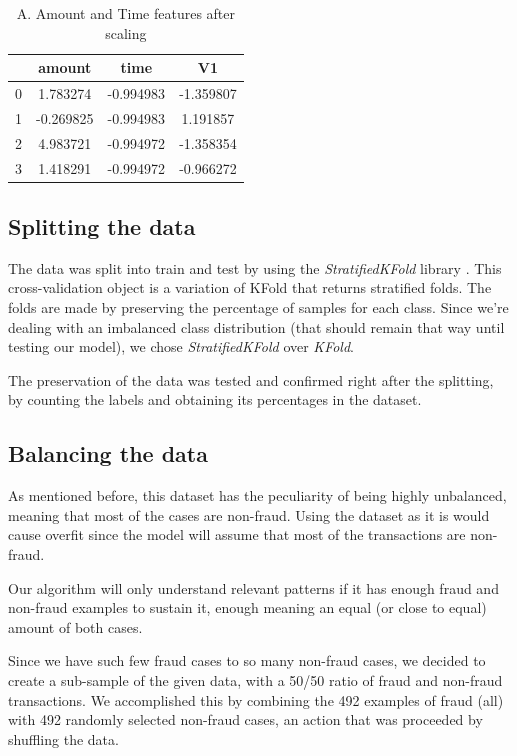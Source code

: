 \documentclass[conference]{IEEEtran}
\begin{document}
\begin{table}[H]
\caption{A. Amount and Time features after scaling}
\begin{center}
\begin{tabular}{|c|c|c|c|}
\hline
\textbf{} & \textbf{amount} & \textbf{time}& \textbf{V1} \\
\hline
0 & 1.783274 & -0.994983 & -1.359807 \\
1 & -0.269825 & -0.994983 & 1.191857 \\
2 & 4.983721 & -0.994972 & -1.358354 \\
3 & 1.418291 & -0.994972 & -0.966272 \\
\hline
\end{tabular}
\end{center}
\end{table}

\subsection{Splitting the data}
The data was split into train and test by using the \textit{StratifiedKFold} library \cite{sklearn_strat_kfold}. This cross-validation object is a variation of KFold that returns stratified folds. The folds are made by preserving the percentage of samples for each class. Since we're dealing with an imbalanced class distribution (that should remain that way until testing our model), we chose \textit{StratifiedKFold} over \textit{KFold}.

The preservation of the data was tested and confirmed right after the splitting, by counting the labels and obtaining its percentages in the dataset.

\subsection{Balancing the data}
As mentioned before, this dataset has the peculiarity of being highly unbalanced, meaning that most of the cases are non-fraud. Using the dataset as it is would cause overfit since the model will assume that most of the transactions are non-fraud.

Our algorithm will only understand relevant patterns if it has enough fraud and non-fraud examples to sustain it, enough meaning an equal (or close to equal) amount of both cases.

Since we have such few fraud cases to so many non-fraud cases, we decided to create a sub-sample of the given data, with a  50/50 ratio of fraud and non-fraud transactions.
We accomplished this by combining the 492 examples of fraud (all) with 492 randomly selected non-fraud cases, an action that was proceeded by shuffling the data.
\end{document}
